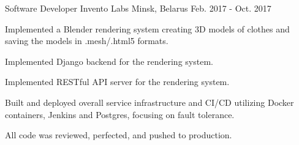\begin{cventries}
  \cventry
    {Software Developer} %
    {Invento Labs} %
    {Minsk, Belarus} %
    {Feb. 2017 - Oct. 2017} %
    {
      \begin{cvitems} %
        \item {Implemented a Blender rendering system creating 3D models of clothes and saving the models in .mesh/.html5 formats.}
        \item {Implemented Django backend for the rendering system.}
        \item {Implemented RESTful API server for the rendering system.}
        \item {Built and deployed overall service infrastructure and CI/CD utilizing Docker containers, Jenkins and Postgres, focusing on fault tolerance.}
        \item {All code was reviewed, perfected, and pushed to production.}
      \end{cvitems}
    }

\end{cventries}
